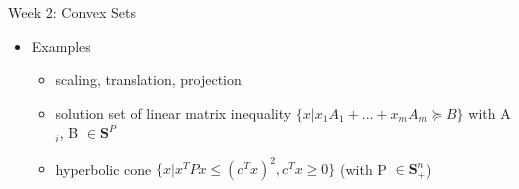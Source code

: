 \documentclass{article}
\begin{document}
\begin{homeworkProblemName}{{\LARGE Week 2: Convex Sets}}
\begin{problemAnswer}
{\begin{itemize}
\begin{itemize}
        \item The inverse image f$^{-1}$(C) of a convex set under f is convex

          \[C \subseteq \bm{R^m} \text{ convex } \implies f^{-1}(C) = \{x \in \bm{R^n} | f(x) \in C\} \text{ convex}\]
        \end{itemize}

      \item Examples
        \begin{itemize}
        \item scaling, translation, projection
        \item solution set of linear matrix inequality $\{x | x_1A_1 + ... +
          x_mA_m \succeq B\}$ with A$_i$, B $\in \bm{S}^P$
        \item hyperbolic cone $\{x | x^TPx \leq(c^Tx)^2, c^Tx \geq 0\}$ (with P $\in \bm{S}^n_+$)

      \end{itemize}
      \end{itemize}
    }\end{problemAnswer}  
  
\end{homeworkProblemName}
\end{document}
